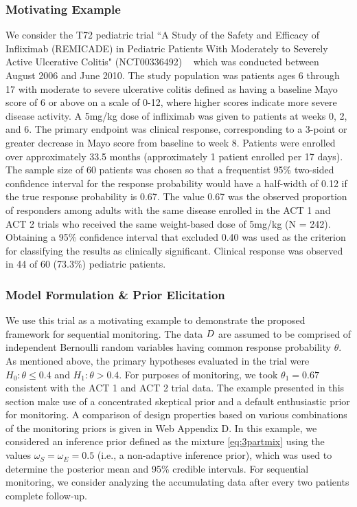 \documentclass[AMA,STIX1COL,doublespace]{WileyNJD-v2}
\begin{document}
\subsubsection{Motivating Example}
We consider the T72 pediatric trial ``A Study of the Safety and Efficacy of Infliximab (REMICADE) in Pediatric Patients With Moderately to Severely Active Ulcerative Colitis" (NCT00336492) ~\citep{Hyams2012} which was conducted between August 2006 and June 2010.
%
The study population was patients ages 6 through 17 with moderate to severe ulcerative colitis defined as having a baseline Mayo score of 6 or above on a scale of 0-12, where higher scores indicate more severe disease activity.
%
A 5mg/kg dose of infliximab was given to patients at weeks 0, 2, and 6.
%
The primary endpoint was clinical response, corresponding to a 3-point or greater decrease in Mayo score from baseline to week 8. 
%
Patients were enrolled over approximately 33.5 months (approximately 1 patient enrolled per 17 days). 
%
The sample size of 60 patients was chosen so that a frequentist 95\% two-sided confidence interval for the response probability would have a half-width of 0.12 if the true response probability is 0.67.
%
The value 0.67 was the observed proportion of responders among adults with the same disease enrolled in the ACT 1 and ACT 2 trials \citep{Rutgeerts2005} who received the same weight-based dose of 5mg/kg (N = 242).
%
Obtaining a 95\% confidence interval that excluded 0.40 was used as the criterion for classifying the results as clinically significant.
%
Clinical response was observed in 44 of 60 (73.3\%) pediatric patients.

\subsubsection{Model Formulation \& Prior Elicitation}\label{sec:example1model} We use this trial as a motivating example to demonstrate the proposed 
framework for sequential monitoring. The data $\boldmath{D}$ are assumed to be comprised of independent Bernoulli random variables having common response 
probability $\theta$. 
%
As mentioned above, the primary hypotheses evaluated in the trial were $H_0:\theta \le 0.4$ and $H_1: \theta>0.4$.
%
For purposes of monitoring, we took $\theta_1=0.67$ consistent with the ACT 1 and ACT 2 trial data. 
%
The example presented in this section make use of a concentrated skeptical prior and a default enthusiastic prior for monitoring.
%
%
A comparison of design properties based on various combinations of the monitoring priors is given in Web Appendix D.
%
In this example, we considered an inference prior defined as the mixture \eqref{eq:3partmix} using the values $\omega_S=\omega_E=0.5$ (i.e., a non-adaptive inference prior), which was used to determine the posterior mean and 95\% credible intervals. For sequential monitoring, we consider analyzing the accumulating data after every two patients complete follow-up.
\end{document}
